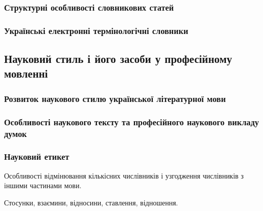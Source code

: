 \documentclass[a4paper,10pt,notitlepage,pdftex,headsepline]{scrartcl}
\begin{document}
      \subsubsection{Структурні особливості словникових статей}
      \subsubsection{Українські електронні термінологічні словники}

  \subsection{Науковий стиль і його засоби у професійному мовленні}
      \subsubsection{Розвиток наукового стилю української літературної мови}
      \subsubsection{Особливості наукового тексту та професійного наукового
      викладу думок}
      \subsubsection{Науковий етикет}


    Особливості відмінювання кількісних числівників і узгодження числівників з
    іншими частинами мови.

    Стосунки, взаємини, відносини, ставлення, відношення.
\end{document}
